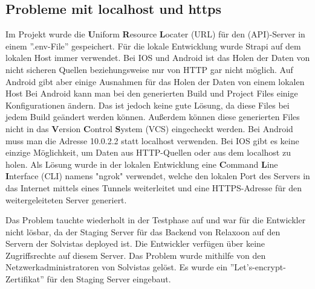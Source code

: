 \begin{spacing}{1}


    \section{Probleme mit localhost und https}\label{sec:probleme-mit-localhost-und-https}

    Im Projekt wurde  die \textbf{U}niform \textbf{R}esource
    \textbf{L}ocater (URL) für den (API)-Server in einem ''.env-File'' gespeichert.
    Für die lokale Entwicklung wurde Strapi auf dem lokalen Host immer verwendet.
    Bei IOS und Android ist das Holen der Daten von nicht sicheren Quellen
    beziehungsweise nur von HTTP gar nicht möglich. Auf Android gibt aber einige
    Ausnahmen für das Holen der Daten von einem lokalen Host
    Bei Android kann man bei den generierten Build und Project Files einige Konfigurationen ändern.
    Das ist jedoch keine gute Lösung, da diese Files bei jedem Build geändert werden können.
    Außerdem können diese generierten Files nicht in das \textbf{V}ersion \textbf{C}ontrol \textbf{S}ystem (VCS)
    eingecheckt werden.
    Bei Android muss man die Adresse 10.0.2.2 statt localhost verwenden.\cite{androidFetch}
    Bei IOS gibt es keine einzige Möglichkeit,
    um Daten aus HTTP-Quellen oder aus dem localhost zu holen.
    Als Lösung wurde in der lokalen Entwicklung eine \textbf{C}ommand \textbf{L}ine \textbf{I}nterface (CLI) namens "ngrok" verwendet,
    welche den lokalen Port des Servers in das Internet mittels eines Tunnels weiterleitet
    und eine HTTPS-Adresse für den weitergeleiteten Server generiert.

    Das Problem tauchte wiederholt in der Testphase auf und war für die Entwickler nicht lösbar,
    da der Staging Server für das Backend von Relaxoon auf den Servern der Solvistas deployed ist.
    Die Entwickler verfügen über keine Zugriffsrechte auf diesem Server.
    Das Problem wurde mithilfe von den Netzwerkadministratoren von Solvistas gelöst.
    Es wurde ein ''Let's-encrypt-Zertifikat'' für den Staging Server eingebaut.






\end{spacing}
